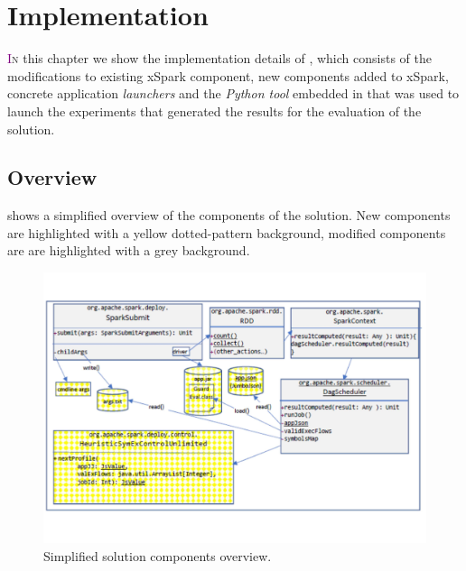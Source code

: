 \chapter{Implementation} \label{chap:implementation}

\lettrine[lines=4]{\textcolor{purple}{I}}{n} this chapter we show the implementation details of \tool, which consists of the modifications to existing xSpark component, new components added to xSpark, \textit\approach\xspace concrete application \textit {launchers} and the \textit{Python tool} embedded in \tool that was used to launch the experiments that generated the results for the evaluation of the solution.


\section{Overview}\label{sec:impl_overview}
 shows a simplified overview of the components of the solution. New components are highlighted with a yellow dotted-pattern background, modified components are are highlighted with a grey background.
\begin{figure}[tbhp]
	\centering
	\includegraphics[width=12cm]{images/solution_impl_overview}
	\caption{Simplified solution components overview.}
	\label{fig:solution_impl_overview}
\end{figure}


